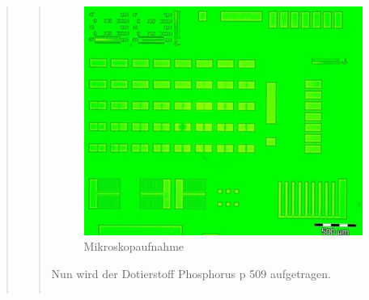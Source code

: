 \begin{quote}
\begin{quote}
    	\vspace{2em}
            
    		\begin{figure}[H]
				\hspace{4.7 cm}
                \includegraphics[scale=0.5, trim = 0cm 0cm 0cm 0cm,clip]
                	{./HerstellungBilder/Mikroskopbild1.png}
                  \caption{Mikroskopaufnahme}
                \label{fig:mikro1}
            \end{figure}
            
    	\vspace{2em}
            
    	Nun wird der Dotierstoff Phosphorus p 509 aufgetragen.        
    
    	\vspace{2em}
    
    	\begin{center}
                \begin{tabular}{ll}


\end{tabular}
\end{center}
\end{quote}
\end{quote}
